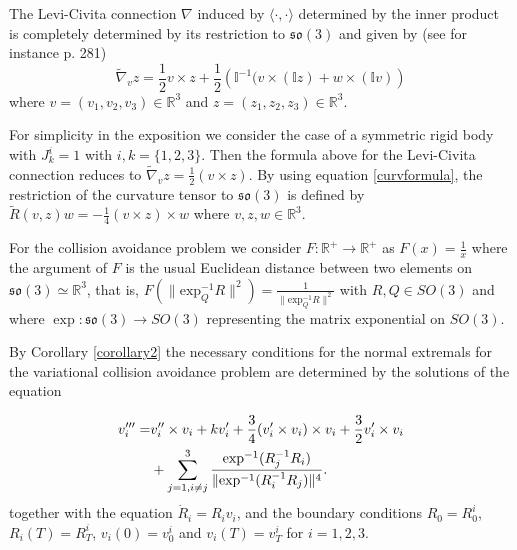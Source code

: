 \documentclass[letterpaper, 10 pt, conference]{ieeeconf}  %
\begin{document}
The Levi-Civita connection $\nabla$ induced by $\langle\cdot,\cdot\rangle$ determined by the inner product is completely determined by its restriction to $\mathfrak{so}(3)$ and given by (see for instance \cite{bookBullo} p. 281)
$$\widetilde{\nabla}_{v} z=\frac{1}{2}v\times z+\frac{1}{2}\left(\mathbb{I}^{-1}(v\times(\mathbb{I}z)+w\times(\mathbb{I}v)\right)$$ where $v=(v_1,v_2,v_3)\in\mathbb{R}^{3}$ and $z=(z_1,z_2,z_3) \in \mathbb{R}^3$.

For simplicity in the exposition we consider the case of a symmetric rigid body with $J_k^i=1$ with $i,k=\{1,2,3\}$. Then the formula above for the Levi-Civita connection reduces to
$\displaystyle{\widetilde{\nabla}_{v} z=\frac{1}{2}(v\times z).}$
By using equation \eqref{curvformula}, the  restriction of the curvature tensor  to  $\mathfrak{so}(3)$ is defined by
$\displaystyle{\widetilde{R}(v,z)w=-\frac 14 (v\times z)\times w}$
where $v,z,w \in \mathbb{R}^3$.



For the collision avoidance problem we consider $F:\mathbb{R}^{+}\to\mathbb{R}^{+}$ as $F(x)=\frac{1}{x}$ where the argument of $F$ is the usual Euclidean distance between two elements on $\mathfrak{so}(3)\simeq\mathbb{R}^{3}$, that is, $F(\|\mbox{exp}_{Q}^{-1}R\|^2)=\frac{1}{\|\mbox{exp}_{Q}^{-1}R\|^2}$ with $R,Q\in SO(3)$ and where $\exp:\mathfrak{so}(3)\to SO(3)$ representing the matrix exponential on $SO(3)$.

By Corollary \ref{corollary2} the necessary conditions for the normal extremals for the variational collision avoidance problem are determined by the solutions of the equation

\begin{align*}
v_i'''= &v_i''\times v_i + k v_i'+ \frac{3}{4}(v_i' \times v_i)\times v_i + \frac{3}{2}v_i'\times v_i \\ &+ \sum\limits_{j=1,i\neq j}^{3} \frac{\hbox{exp}^{-1}(R_j^{-1}R_i)}{\|\mbox{exp}^{-1}(R_i^{-1}R_j)\|^4}. %
\end{align*}
together with the equation $\dot{R}_i=R_iv_i$, and the boundary conditions $R_{0}=R_0^i$, $R_i(T)=R_T^i$, $v_i(0)=v_0^i$ and $v_i(T)=v^i_T$ for $i=1,2,3$.
\end{document}
